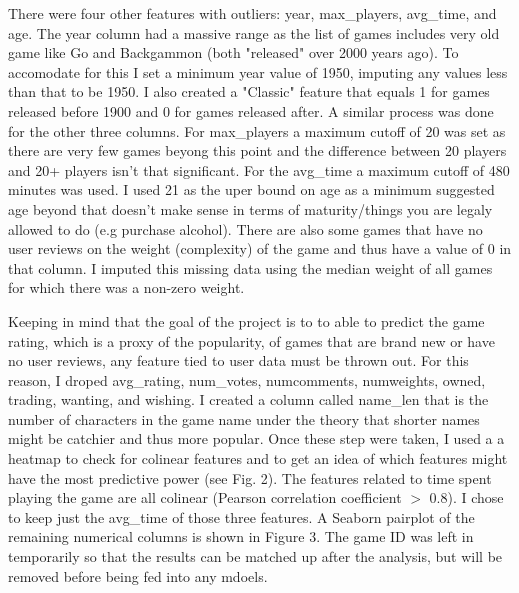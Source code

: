 \documentclass[12pt]{article}
\begin{document}
There were four other features with outliers: year, max\_players, avg\_time, and age. The year column had a massive range as the list of games includes very old game like Go and Backgammon (both "released" over 2000 years ago). To accomodate for this I set a minimum year value of 1950, imputing any values less than that to be 1950. I also created a "Classic" feature that equals 1 for games released before 1900 and 0 for games released after. A similar process was done for the other three columns. For max\_players a maximum cutoff of 20 was set as there are very few games beyong this point and the difference between 20 players and 20+ players isn't that significant. For the avg\_time a maximum cutoff of 480 minutes was used. I used 21 as the uper bound on age as a minimum suggested age beyond that doesn't make sense in terms of maturity/things you are legaly allowed to do (e.g purchase alcohol). There are also some games that have no user reviews on the weight (complexity) of the game and thus have a value of 0 in that column. I imputed this missing data using the median weight of all games for which there was a non-zero weight.

Keeping in mind that the goal of the project is to to able to predict the game rating, which is a proxy of the popularity, of games that are brand new or have no user reviews, any feature tied to user data must be thrown out. For this reason, I droped avg\_rating, num\_votes, numcomments, numweights, owned, trading, wanting, and wishing. I created a column called name\_len that is the number of characters in the game name under the theory that shorter names might be catchier and thus more popular. Once these step were taken, I used a a heatmap to check for colinear features and to get an idea of which features might have the most predictive power (see Fig. 2). The features related to time spent playing the game are all colinear (Pearson correlation coefficient $>$ 0.8). I chose to keep just the avg\_time of those three features. A Seaborn pairplot of the remaining numerical columns is shown in Figure 3. The game ID was left in temporarily so that the results can be matched up after the analysis, but will be removed before being fed into any mdoels.
\end{document}
